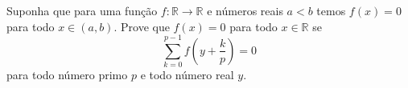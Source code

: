 Suponha que para uma função \(f\colon  \mathbb{R}\to \mathbb{R}\) e números reais \(a<b\) temos \(f(x)=0\) para todo \(x\in (a,b)\). Prove que \(f(x)=0\) para todo \(x\in \mathbb{R}\) se
\[\sum^{p-1}_{k=0}f\left(y+\frac{k}{p}\right)=0\]
para todo número primo \(p\) e todo número real \(y.\)
